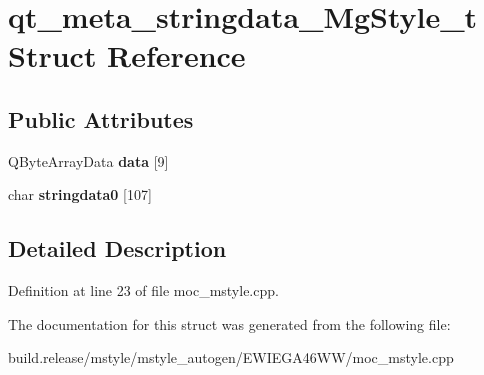\hypertarget{structqt__meta__stringdata___mg_style__t}{}\section{qt\+\_\+meta\+\_\+stringdata\+\_\+\+Mg\+Style\+\_\+t Struct Reference}
\label{structqt__meta__stringdata___mg_style__t}
\subsection*{Public Attributes}
\begin{DoxyCompactItemize}
\item 
\mbox{\label{structqt__meta__stringdata___mg_style__t_acd8f61515d2f74f99e4d6a943d84b568}} 
Q\+Byte\+Array\+Data {\bfseries data} \mbox{[}9\mbox{]}
\item 
\mbox{\label{structqt__meta__stringdata___mg_style__t_a2b5f611b0d826a8ab68a3f2397a23d21}} 
char {\bfseries stringdata0} \mbox{[}107\mbox{]}
\end{DoxyCompactItemize}


\subsection{Detailed Description}


Definition at line 23 of file moc\+\_\+mstyle.\+cpp.



The documentation for this struct was generated from the following file\+:\begin{DoxyCompactItemize}
\item 
build.\+release/mstyle/mstyle\+\_\+autogen/\+E\+W\+I\+E\+G\+A46\+W\+W/moc\+\_\+mstyle.\+cpp\end{DoxyCompactItemize}
